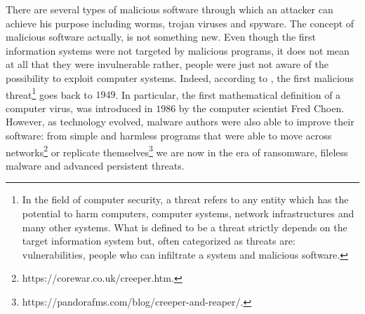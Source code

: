 \documentclass[LaM,binding=0.6cm]{sapthesis}
\begin{document}
There are several types of malicious software through which an attacker can achieve his purpose including worms, trojan viruses and spyware. The concept of malicious software actually, is not something new\cite{Historyo87:online}. Even though the first information systems were not targeted by malicious programs, it does not mean at all that they were invulnerable rather, people were just not aware of the possibility to exploit computer systems. Indeed, according to \cite{Whendidt95:online}, the first malicious threat\footnote{In the field of computer security, a threat refers to any entity which has the potential to harm computers, computer systems, network infrastructures and many other systems. What is defined to be a threat strictly depends on the target information system but, often categorized as threats are: vulnerabilities, people who can infiltrate a system and malicious software.} goes back to $1949$. In particular, the first mathematical definition of a computer virus, was introduced in $1986$ by the computer scientist Fred Choen\cite{cohen1987computer}.\\
However, as technology evolved, malware authors were also able to improve their software: from simple and harmless programs that were able to move across networks\footnote{https://corewar.co.uk/creeper.htm.} or replicate themselves\footnote{https://pandorafms.com/blog/creeper-and-reaper/.} we are now in the era of ransomware, fileless malware\cite{alzurigrowth} 
and advanced persistent threats\cite{virvilis2013big}.\\
\end{document}

